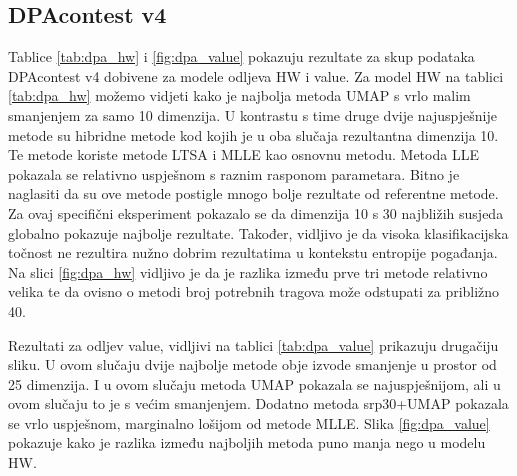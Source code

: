 \documentclass[times, utf8, diplomski]{fer}
\begin{document}
\subsection{DPAcontest v4}
Tablice \ref{tab:dpa_hw} i \ref{fig:dpa_value} pokazuju rezultate za skup podataka DPAcontest v4 dobivene za modele odljeva HW i value. Za model HW na tablici \ref{tab:dpa_hw} možemo vidjeti kako je najbolja metoda UMAP s vrlo malim smanjenjem za samo 10 dimenzija. U kontrastu s time druge dvije najuspješnije metode su hibridne metode kod kojih je u oba slučaja rezultantna dimenzija 10. Te metode koriste metode LTSA i MLLE kao osnovnu metodu. Metoda LLE pokazala se relativno uspješnom s raznim rasponom parametara. Bitno je naglasiti da su ove metode postigle mnogo bolje rezultate od referentne metode. Za ovaj specifični eksperiment pokazalo se da dimenzija 10 s 30 najbližih susjeda globalno pokazuje najbolje rezultate. Također, vidljivo je da visoka klasifikacijska točnost ne rezultira nužno dobrim rezultatima u kontekstu entropije pogađanja. Na slici \ref{fig:dpa_hw} vidljivo je da je razlika između prve tri metode relativno velika te da ovisno o metodi broj potrebnih tragova može odstupati za približno 40.

Rezultati za odljev value, vidljivi na tablici \ref{tab:dpa_value} prikazuju drugačiju sliku. U ovom slučaju dvije najbolje metode obje izvode smanjenje u prostor od 25 dimenzija. I u ovom slučaju metoda UMAP pokazala se najuspješnijom, ali u ovom slučaju to je s većim smanjenjem. Dodatno metoda srp30+UMAP pokazala se vrlo uspješnom, marginalno lošijom od metode MLLE.  Slika \ref{fig:dpa_value} pokazuje kako je razlika između najboljih metoda puno manja nego u modelu HW.
\end{document}
